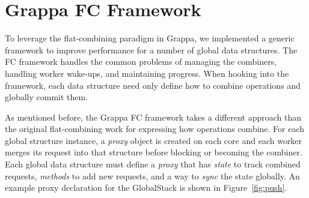 \section{Grappa FC Framework}
To leverage the flat-combining paradigm in Grappa, we implemented a generic framework to improve performance for a number of global data structures. The FC framework handles the common problems of managing the combiners, handling worker wake-ups, and maintaining progress. When hooking into the framework, each data structure need only define how to combine operations and globally commit them.

As mentioned before, the Grappa FC framework takes a different approach than the original flat-combining work for expressing how operations combine.
For each global structure instance, a \emph{proxy} object is created on each core and each worker merges its request into that structure before blocking or becoming the combiner.
Each global data structure must define a \emph{proxy} that has \emph{state} to track combined requests, \emph{methods} to add new requests, and a way to \emph{sync} the state globally.
An example proxy declaration for the GlobalStack is shown in Figure~\ref{fig:push}.

